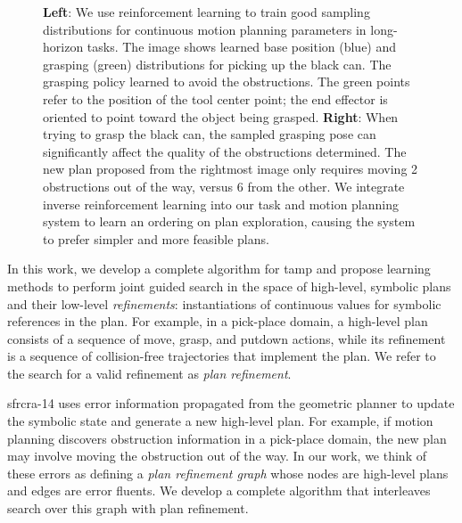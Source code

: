 \begin{figure}[t]
  \caption{\small{\textbf{Left}: We use reinforcement learning to train good sampling distributions for
      continuous motion planning parameters in long-horizon tasks.
      The image shows learned base position (blue) and
      grasping (green) distributions for picking up the black can. The grasping
      policy learned to avoid the obstructions. The green points refer
      to the position of the tool center point; the end effector is oriented
      to point toward the object being grasped. \textbf{Right}: When trying to grasp the black can, the sampled grasping pose can
      significantly affect the quality of the obstructions determined. The new plan proposed from the rightmost image only
      requires moving 2 obstructions out of the way, versus 6 from the other. We integrate inverse reinforcement learning into our task and
      motion planning system to learn an ordering on plan exploration, causing the system to prefer simpler and more feasible plans.}}
  \label{fig:cover}
\end{figure}

In this work, we develop a complete algorithm for {\sc tamp} and propose learning
methods to perform joint guided search in the space of
high-level, symbolic plans and their low-level
\emph{refinements}: instantiations of continuous values for
symbolic references in the plan. For example, in a pick-place domain, a high-level plan
consists of a sequence of move, grasp, and putdown actions, while its refinement is a sequence of
collision-free trajectories that implement the plan. We refer to the search for a valid
refinement as \emph{plan refinement}.

{\sc sfrcra-14} uses error information propagated from the geometric planner
to update the symbolic state and generate a new high-level plan.
For example, if motion planning discovers obstruction information in a pick-place domain, the
new plan may involve moving the obstruction out of the way.
In our work, we think of these errors as defining a \emph{plan refinement graph} whose nodes are high-level plans
and edges are error fluents. We develop a complete algorithm that interleaves
search over this graph with plan refinement.

